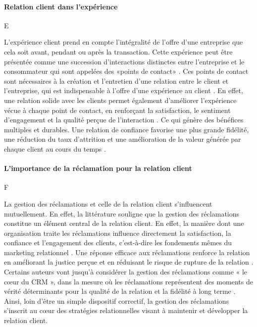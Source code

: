 \documentclass[a4paper,12pt, openany]{book}
\begin{document}
\paragraph{Relation client dans l'expérience} E

L'expérience client prend en compte l'intégralité de l'offre d'une entreprise que cela soit avant, pendant ou après la transaction. Cette expérience peut être présentée comme une succession d'interactions distinctes entre l'entreprise et le consommateur qui sont appelées des «\;points de contact\;» \parencite{homburg17}. Ces points de contact sont nécessaires à la création et l'entretien d'une relation entre le client et l'entreprise, qui est indispensable à l'offre d'une expérience au client \parencite{schmitt03}. En effet, une relation solide avec les clients permet également d'améliorer l'expérience vécue à chaque point de contact, en renforçant la satisfaction, le sentiment d'engagement et la qualité perçue de l'interaction \parencite{lemon16}. Ce qui génère des bénéfices multiples et durables. Une relation de confiance favorise une plus grande fidélité, une réduction du taux d'attrition et une amélioration de la valeur générée par chaque client au cours du temps \parencite{palmatier06, kumar06}.



\paragraph{L'importance de la réclamation pour la relation client} F


La gestion des réclamations et celle de la relation client s'influencent mutuellement. En effet, la littérature souligne que la gestion des réclamations constitue un élément central de la relation client. En effet, la manière dont une organisation traite les réclamations influence directement la satisfaction, la confiance et l'engagement des clients, c'est-à-dire les fondements mêmes du marketing relationnel \parencite{tax98complaint, lewis83}. Une réponse efficace aux réclamations renforce la relation en améliorant la justice perçue et en réduisant le risque de rupture de la relation \parencite{davidow03}. Certains auteurs vont jusqu'à considérer la gestion des réclamations comme « le cœur du CRM », dans la mesure où les réclamations représentent des moments de vérité déterminants pour la qualité de la relation et la fidélité à long terme \parencite{wirtz06}. Ainsi, loin d'être un simple dispositif correctif, la gestion des réclamations s'inscrit au cœur des stratégies relationnelles visant à maintenir et développer la relation client.
\end{document}
